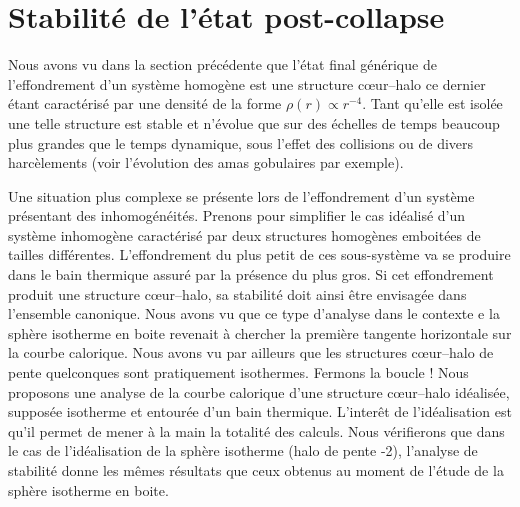 \section{Stabilité de l'état post-collapse}

Nous avons vu dans la section précédente que l'état final générique de l'effondrement d'un système homogène est une structure c\oe ur--halo ce dernier étant caractérisé par une densité de la forme $\rho(r)\propto r^{-4}$.  Tant qu'elle est isolée une telle structure est stable et n'évolue que sur des échelles de temps beaucoup plus grandes que le temps dynamique, sous l'effet des collisions ou de divers harcèlements (voir l'évolution des amas gobulaires par exemple). 

Une situation plus complexe se présente lors de l'effondrement d'un système présentant des inhomogénéités. Prenons pour simplifier le cas idéalisé d'un système inhomogène caractérisé par deux structures homogènes emboitées de tailles différentes. L'effondrement du plus petit de ces sous-système va se produire dans le bain thermique assuré par la présence du plus gros. Si cet effondrement produit une structure c\oe ur--halo, sa stabilité doit ainsi être envisagée dans l'ensemble canonique. Nous avons vu que ce type d'analyse dans le contexte e la sphère isotherme en boite revenait à chercher la première tangente horizontale sur la courbe calorique. Nous avons vu par ailleurs que les structures c\oe ur--halo de pente quelconques sont pratiquement isothermes. Fermons la boucle ! Nous proposons une analyse de la courbe calorique d'une structure c\oe ur--halo idéalisée, supposée isotherme et entourée d'un bain thermique. L'interêt de l'idéalisation est qu'il permet de mener à la main la totalité des calculs. Nous vérifierons que dans le cas de l'idéalisation de la sphère isotherme (halo de pente -2), l'analyse de stabilité donne les mêmes résultats que ceux obtenus au moment de l'étude de la sphère isotherme en boite.

